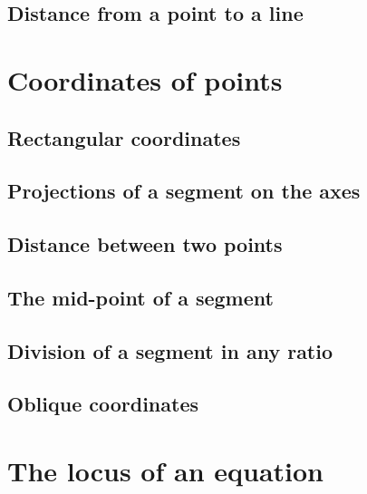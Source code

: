 \documentclass{book}
\begin{document}
	\section{Distance from a point to a line} \lipsum[6]

\chapter{Coordinates of points}
	\section{Rectangular coordinates} \lipsum[1]
	\section{Projections of a segment on the axes} \lipsum[2]
	\section{Distance between two points} \lipsum[3]
	\section{The mid-point of a segment} \lipsum[4]
	\section{Division of a segment in any ratio} \lipsum[5]
	\section{Oblique coordinates} \lipsum[6]

\chapter{The locus of an equation}
\end{document}
